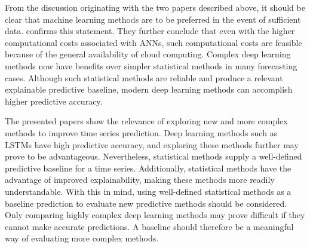 From the discussion originating with the two papers described above,
it should be clear that machine learning methods are to be preferred in the event of sufficient data.
\cite{Hewamalage2021} confirms this statement. They further conclude that even with the higher computational costs
associated with ANNs, such computational costs are feasible because of the general availability of cloud computing.
Complex deep learning methods now have benefits over simpler statistical methods in many forecasting cases.
Although such statistical methods are reliable and produce a relevant explainable predictive baseline,
modern deep learning methods can accomplish higher predictive accuracy.

The presented papers show the relevance of exploring new and more complex methods to improve time series prediction.
Deep learning methods such as LSTMs have high predictive accuracy,
and exploring these methods further may prove to be advantageous.
Nevertheless, statistical methods supply a well-defined predictive baseline for a time series.
Additionally, statistical methods have the advantage of improved explainability,
making these methods more readily understandable.
With this in mind, using well-defined statistical methods as a baseline prediction to evaluate new predictive methods should be considered.
Only comparing highly complex deep learning methods may prove difficult if they cannot make accurate predictions.
A baseline should therefore be a meaningful way of evaluating more complex methods.

\iffalse
  The paper \cite{Bandara2017} points out that in non-stationary time series, the distant past is typically less
  useful for forecast, as underlying patterns and relationships will have changed in the meantime.

  In \autoref{section:RelatedWork:forecasting-ecommerce}
  we highlighted ANNs ability to outperform statistical methods when macro-economic
  conditions were unstable.
  In \autoref{section:RelatedWork:Model-structure} we mentioned how statistical models
  potentially missed the bigger picture in a domain of many related time series.
  These findings makes it clear to us that limiting our solution to a statistical method
  will be a mistake, and exploring a more complicated ANN model seems beneficial.
  However, a need for a baseline model in order to compare the results of the ANN model,
  a statistical method, like SARIMA could be useful.
\fi
